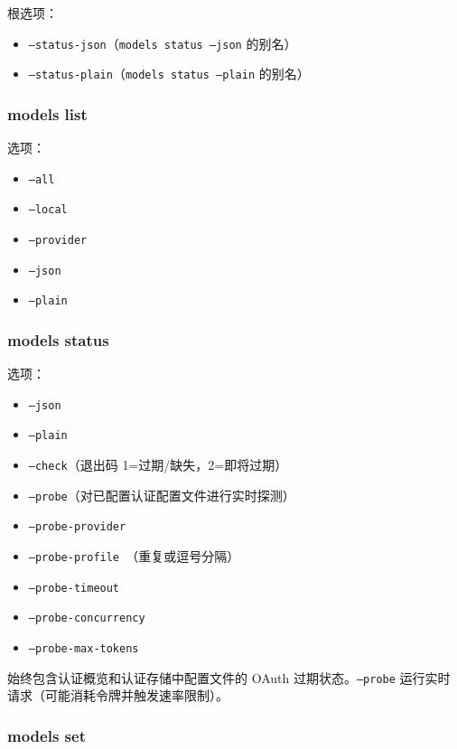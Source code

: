 根选项：

\begin{itemize}
  \item \texttt{--status-json}（\texttt{models status --json} 的别名）
  \item \texttt{--status-plain}（\texttt{models status --plain} 的别名）
\end{itemize}


\subsubsection{models list}


选项：

\begin{itemize}
  \item \texttt{--all}
  \item \texttt{--local}
  \item \texttt{--provider }
  \item \texttt{--json}
  \item \texttt{--plain}
\end{itemize}


\subsubsection{models status}


选项：

\begin{itemize}
  \item \texttt{--json}
  \item \texttt{--plain}
  \item \texttt{--check}（退出码 1=过期/缺失，2=即将过期）
  \item \texttt{--probe}（对已配置认证配置文件进行实时探测）
  \item \texttt{--probe-provider }
  \item \texttt{--probe-profile }（重复或逗号分隔）
  \item \texttt{--probe-timeout }
  \item \texttt{--probe-concurrency }
  \item \texttt{--probe-max-tokens }
\end{itemize}


始终包含认证概览和认证存储中配置文件的 OAuth 过期状态。\texttt{--probe} 运行实时请求（可能消耗令牌并触发速率限制）。

\subsubsection{models set }


